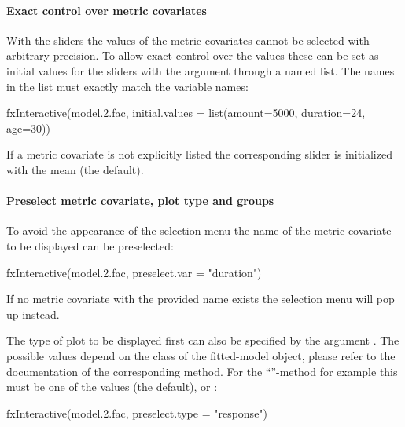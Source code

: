 \documentclass[nojss]{jss}
\newcommand{\class}[1]{``\code{#1}''}
\begin{document}
\vspace{-0.3cm}\paragraph{Exact control over metric covariates} 
With the sliders the values of the metric covariates cannot be selected with arbitrary precision. To allow exact control over the values these can be set as initial values for the sliders with the argument  through a named list. The names in the list must exactly match the variable names:
%
\begin{Schunk}
\begin{Sinput}
 fxInteractive(model.2.fac,
     initial.values = list(amount=5000, duration=24, age=30))
\end{Sinput}
\end{Schunk}
%

If a metric covariate is not explicitly listed the corresponding slider is initialized with the mean (the default). 

\vspace{-0.3cm}\paragraph{Preselect metric covariate, plot type and groups}
To avoid the appearance of the selection menu the name of the metric covariate to be displayed can be preselected:
%
\begin{Schunk}
\begin{Sinput}
 fxInteractive(model.2.fac, preselect.var = "duration")
\end{Sinput}
\end{Schunk}
%
If no metric covariate with the provided name exists the selection menu will pop up instead.

The type of plot to be displayed first can also be specified by the argument . The possible values depend on the class of the fitted-model object, please refer to the documentation of the corresponding method. For the \class{glm}-method for example this must be one of the values  (the default),  or : 
%
\begin{Schunk}
\begin{Sinput}
 fxInteractive(model.2.fac, preselect.type = "response")
\end{Sinput}
\end{Schunk}
%
\end{document}

